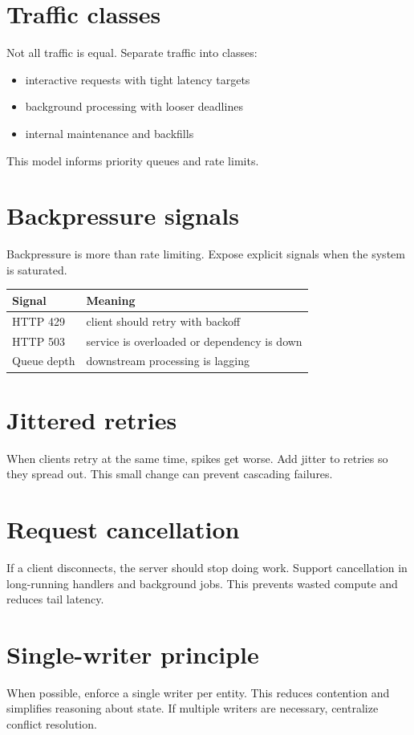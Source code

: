\section{Traffic classes}
Not all traffic is equal.
Separate traffic into classes:
\begin{itemize}[nosep]
  \item interactive requests with tight latency targets
  \item background processing with looser deadlines
  \item internal maintenance and backfills
\end{itemize}

This model informs priority queues and rate limits.

\section{Backpressure signals}
Backpressure is more than rate limiting.
Expose explicit signals when the system is saturated.

\begin{tabularx}{\textwidth}{@{}lX@{}}
\toprule
Signal & Meaning \\
\midrule
HTTP 429 & client should retry with backoff \\
HTTP 503 & service is overloaded or dependency is down \\
Queue depth & downstream processing is lagging \\
\bottomrule
\end{tabularx}

\section{Jittered retries}
When clients retry at the same time, spikes get worse.
Add jitter to retries so they spread out.
This small change can prevent cascading failures.

\section{Request cancellation}
If a client disconnects, the server should stop doing work.
Support cancellation in long-running handlers and background jobs.
This prevents wasted compute and reduces tail latency.

\section{Single-writer principle}
When possible, enforce a single writer per entity.
This reduces contention and simplifies reasoning about state.
If multiple writers are necessary, centralize conflict resolution.

